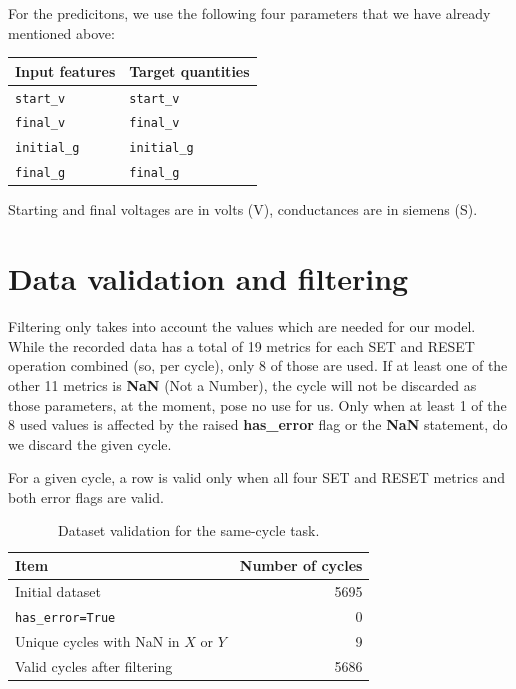 \documentclass[11pt,a4paper]{article}
\begin{document}
For the predicitons, we use the following four parameters that we have already mentioned above:

\begin{center}
\begin{tabular}{ll}
\toprule
Input features & Target quantities \\
\midrule
\texttt{start\_v}   & \texttt{start\_v} \\
\texttt{final\_v}   & \texttt{final\_v} \\
\texttt{initial\_g} & \texttt{initial\_g} \\
\texttt{final\_g}   & \texttt{final\_g} \\
\bottomrule
\end{tabular}
\end{center}

Starting and final voltages are in volts (V), conductances are in siemens (S).

\section{Data validation and filtering}
Filtering only takes into account the values which are needed for our model. While the recorded data has a total of 19 metrics for each SET and RESET operation combined (so, per cycle), only 8 of those are used. If at least one of the other 11 metrics is \textbf{NaN} (Not a Number), the cycle will not be discarded as those parameters, at the moment, pose no use for us. Only when at least 1 of the 8 used values is affected by the raised \textbf{has\_error} flag or the \textbf{NaN} statement, do we discard the given cycle.

For a given cycle, a row is valid only when all four SET and RESET metrics and both error flags are valid.

\begin{table}[H]
\centering
\caption{Dataset validation for the same-cycle task.}
\begin{tabular}{lr}
\toprule
Item & Number of cycles \\
\midrule
Initial dataset & 5695 \\
\texttt{has\_error=True} & 0 \\
Unique cycles with NaN in $X$ or $Y$ & 9 \\
Valid cycles after filtering & 5686 \\
\bottomrule
\end{tabular}
\end{table}
\end{document}
